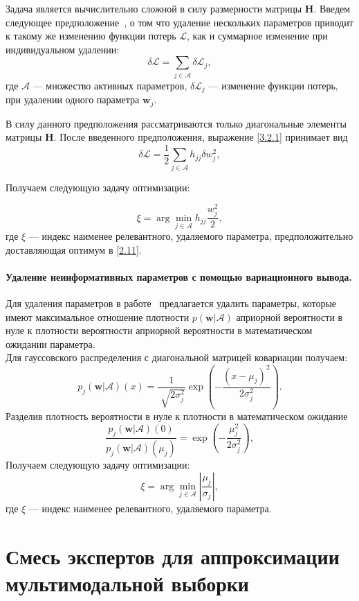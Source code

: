 Задача является вычислительно сложной в силу размерности матрицы \textbf{H}. Введем следующее предположение~\cite{cun1990}, о том что удаление нескольких параметров приводит к такому же изменению функции потерь $\mathcal{L}$, как и суммарное изменение при индивидуальном удалении:
\[
\label{3.2.3}
\delta \mathcal{L} = \sum_{j\in \mathcal{A}} \delta \mathcal{L}_j,
\]
где $\mathcal{A}$ --- множество активных параметров, $\delta\mathcal{L}_j$ --- изменение функции потерь, при удалении одного параметра $\textbf{w}_j$.

В силу данного предположения рассматриваются только диагональные элементы матрицы \textbf{H}. После введенного предположения, выражение \eqref{3.2.1} принимает вид
\[
\label{3.2.4}
\delta \mathcal{L} = \frac{1}{2} \sum_{j\in \mathcal{A}} h_{jj}\delta w_j^2, 
\]

Получаем следующую задачу оптимизации:

\[
\label{3.2.5}
\xi = \arg\min_{j\in \mathcal{A}} h_{jj}\frac{w_j^2}{2},
\]
где $\xi$ --- индекс наименее релевантного, удаляемого параметра, предположительно доставляющая оптимум в \eqref{2.11}.

\paragraph{Удаление неинформативных параметров с помощью вариационного вывода.}
Для удаления параметров в работе~\cite{graves2011} предлагается удалить параметры, которые имеют максимальное отношение плотности $p(\textbf{w}|\mathcal{A})$ априорной вероятности в нуле к плотности вероятности априорной вероятности в математическом ожидании параметра.\\
Для гауссовского распределения с диагональной матрицей ковариации получаем:
\[
\label{3.3.1}
p_j(\textbf{w}|\mathcal{A})(x) = \frac{1}{\sqrt[]{2\sigma_j^2}}\exp({-\frac{(x-\mu_j)^2}{2\sigma_j^2}}).
\]
Разделив плотность вероятности в нуле к плотности в математическом ожидание
\[
\label{3.3.2}
\frac{p_j(\textbf{w}|\mathcal{A})(0)}{p_j(\textbf{w}|\mathcal{A})(\mu_j)}= \exp({-\frac{\mu_j^2}{2\sigma_j^2}}),
\]
Получаем следующую задачу оптимизации:
\[
\label{3.3.3}
\xi = \arg\min_{j\in \mathcal{A}} \left|\frac{\mu_j}{\sigma_j}\right|,
\]
где $\xi$ --- индекс наименее релевантного, удаляемого параметра.

\section{Смесь экспертов для аппроксимации мультимодальной выборки }


